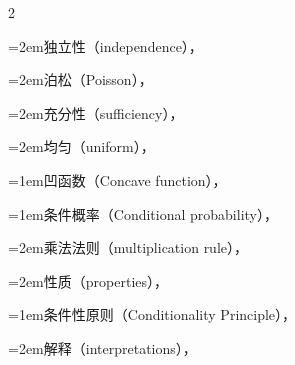 \begin{multicols}{2}
\par\noindent\hangindent=2em\hspace*{1em}\label{idx:117}独立性（independence），\hyperref[thm:6.2.24]{\pageref*{thm:6.2.24}}\par
\par\noindent\hangindent=2em\hspace*{1em}\label{idx:118}泊松（Poisson），\hyperref[exercise:6.18]{\pageref*{exercise:6.18}}\par
\par\noindent\hangindent=2em\hspace*{1em}\label{idx:119}充分性（sufficiency），\hyperref[thm:6.2.24]{\pageref*{thm:6.2.24}}\par
\par\noindent\hangindent=2em\hspace*{1em}\label{idx:120}均匀（uniform），\hyperref[ex:6.2.23]{\pageref*{ex:6.2.23}}\par
\par\addvspace{2pt}
\par\noindent\hangindent=1em\hspace*{0em}\label{idx:121}凹函数（Concave function），\hyperref[def:4.7.6]{\pageref*{def:4.7.6}}\par
\par\addvspace{2pt}
\par\noindent\hangindent=1em\hspace*{0em}\label{idx:122}条件概率（Conditional probability），\hyperref[def:1.3.2]{\pageref*{def:1.3.2}}\par
\par\noindent\hangindent=2em\hspace*{1em}\label{idx:123}乘法法则（multiplication rule），\hyperref[eq:1.3.3]{\pageref*{eq:1.3.3}}\par
\par\noindent\hangindent=2em\hspace*{1em}\label{idx:124}性质（properties），\hyperref[exercise:1.38]{\pageref*{exercise:1.38}}\par
\par\addvspace{2pt}
\par\noindent\hangindent=1em\hspace*{0em}\label{idx:125}条件性原则（Conditionality Principle），\hyperref[idxocc:125:269]{\pageref*{idxocc:125:269}}\par
\par\noindent\hangindent=2em\hspace*{1em}\label{idx:126}解释（interpretations），\hyperref[ex:6.3.7]{\pageref*{ex:6.3.7}}\par

\end{multicols}
